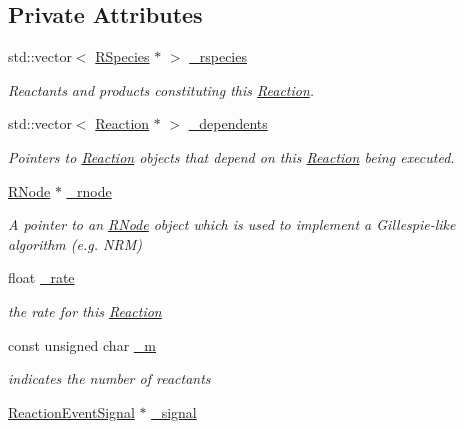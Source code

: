 \subsection*{Private Attributes}
\begin{DoxyCompactItemize}
\item 
std\-::vector$<$ \hyperlink{classchem_1_1RSpecies}{R\-Species} $\ast$ $>$ \hyperlink{classchem_1_1Reaction_a5a8f536126edeb82526f9ac31c3e3c6c}{\-\_\-rspecies}
\begin{DoxyCompactList}\small\item\em Reactants and products constituting this \hyperlink{classchem_1_1Reaction}{Reaction}. \end{DoxyCompactList}\item 
std\-::vector$<$ \hyperlink{classchem_1_1Reaction}{Reaction} $\ast$ $>$ \hyperlink{classchem_1_1Reaction_a10b1e663b3c3677064d2b466e3dca437}{\-\_\-dependents}
\begin{DoxyCompactList}\small\item\em Pointers to \hyperlink{classchem_1_1Reaction}{Reaction} objects that depend on this \hyperlink{classchem_1_1Reaction}{Reaction} being executed. \end{DoxyCompactList}\item 
\hyperlink{classchem_1_1RNode}{R\-Node} $\ast$ \hyperlink{classchem_1_1Reaction_ae10d6d1a25e37bc4b3b5df478094e745}{\-\_\-rnode}
\begin{DoxyCompactList}\small\item\em A pointer to an \hyperlink{classchem_1_1RNode}{R\-Node} object which is used to implement a Gillespie-\/like algorithm (e.\-g. N\-R\-M) \end{DoxyCompactList}\item 
float \hyperlink{classchem_1_1Reaction_a6c5cd99c16816bfcbee48b8c78a0efe5}{\-\_\-rate}
\begin{DoxyCompactList}\small\item\em the rate for this \hyperlink{classchem_1_1Reaction}{Reaction} \end{DoxyCompactList}\item 
const unsigned char \hyperlink{classchem_1_1Reaction_a07b3c7e8a82111c786144158bc3cb4e5}{\-\_\-m}
\begin{DoxyCompactList}\small\item\em indicates the number of reactants \end{DoxyCompactList}\item 
\hyperlink{namespacechem_a85c409cf931d658d253b62ab5ad35781}{Reaction\-Event\-Signal} $\ast$ \hyperlink{classchem_1_1Reaction_a55ca3408f31e6074775d6a8cb2a6b95b}{\-\_\-signal}

\end{DoxyCompactItemize}
